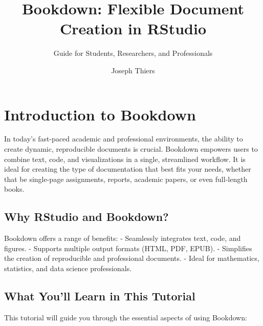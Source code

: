 \documentclass[
]{book}
\title{Bookdown: Flexible Document Creation in RStudio}
\subtitle{Guide for Students, Researchers, and Professionals}
\author{Joseph Thiers}
\date{}
\begin{document}
\maketitle

{
\setcounter{tocdepth}{1}
\tableofcontents
}
\chapter{Introduction to Bookdown}\label{introduction}

In today's fast-paced academic and professional environments, the ability to create dynamic, reproducible documents is crucial. Bookdown empowers users to combine text, code, and visualizations in a single, streamlined workflow. It is ideal for creating the type of documentation that best fits your needs, whether that be single-page assignments, reports, academic papers, or even full-length books.

\section{Why RStudio and Bookdown?}\label{why-rstudio-and-bookdown}

Bookdown offers a range of benefits:
- Seamlessly integrates text, code, and figures.
- Supports multiple output formats (HTML, PDF, EPUB).
- Simplifies the creation of reproducible and professional documents.
- Ideal for mathematics, statistics, and data science professionals.

\section{What You'll Learn in This Tutorial}\label{what-youll-learn-in-this-tutorial}

This tutorial will guide you through the essential aspects of using Bookdown:
\end{document}
